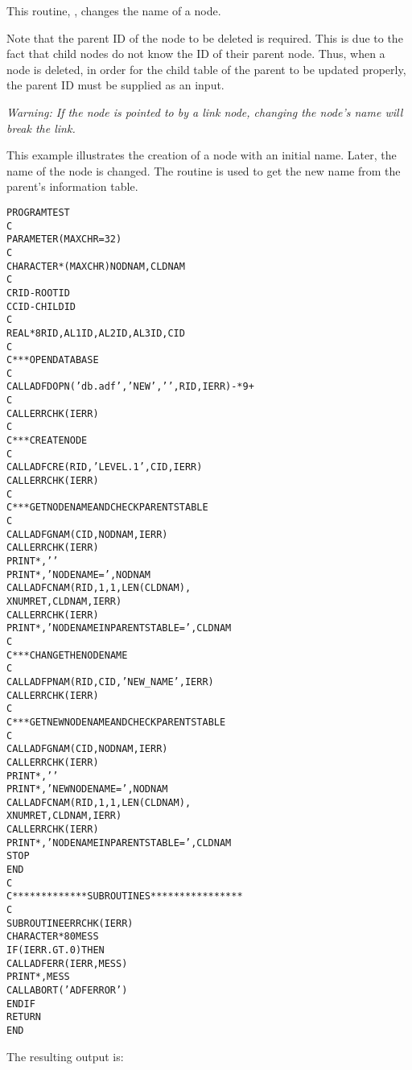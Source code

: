 This routine, , changes the name of a node.

Note that the parent ID of the node to be deleted is required.
This is due to the fact that child nodes do not know the ID of their
parent node.
Thus, when a node is deleted, in order for the child table of the parent
to be updated properly, the parent ID must be supplied as an input.

\emph{Warning: If the node is pointed to by a link node, changing the
node's name will break the link.}

\Example

This example illustrates the creation of a node with an initial name.
Later, the name of the node is changed.
The routine  is used to get the new name from the
parent's information table.

\begin{alltt}
   PROGRAM TEST
   C
         PARAMETER (MAXCHR=32)
   C
         CHARACTER*(MAXCHR) NODNAM,CLDNAM
   C
   C     RID - ROOT ID
   C     CID - CHILD ID
   C
         REAL*8 RID,AL1ID,AL2ID,AL3ID,CID
   C
   C *** OPEN DATABASE
   C
         CALL ADFDOPN('db.adf','NEW',' ',RID,IERR)-*9+
   C
         CALL ERRCHK(IERR)
   C
   C *** CREATE NODE
   C
         CALL ADFCRE(RID,'LEVEL.1',CID,IERR)
         CALL ERRCHK(IERR)
   C
   C *** GET NODE NAME AND CHECK PARENTS TABLE
   C
         CALL ADFGNAM(CID,NODNAM,IERR)
         CALL ERRCHK(IERR)
         PRINT *,' '
         PRINT *,' NODE NAME = ',NODNAM
         CALL ADFCNAM(RID,1,1,LEN(CLDNAM),
        X             NUMRET,CLDNAM,IERR)
         CALL ERRCHK(IERR)
         PRINT *,' NODE NAME IN PARENTS TABLE = ',CLDNAM
   C
   C *** CHANGE THE NODE NAME
   C
         CALL ADFPNAM(RID,CID,'NEW_NAME',IERR)
         CALL ERRCHK(IERR)
   C
   C *** GET NEW NODE NAME AND CHECK PARENTS TABLE
   C
         CALL ADFGNAM(CID,NODNAM,IERR)
         CALL ERRCHK(IERR)
         PRINT *,' '
         PRINT *,' NEW NODE NAME = ',NODNAM
         CALL ADFCNAM(RID,1,1,LEN(CLDNAM),
        X             NUMRET,CLDNAM,IERR)
         CALL ERRCHK(IERR)
         PRINT *,' NODE NAME IN PARENTS TABLE = ',CLDNAM
         STOP
         END
   C
   C ************* SUBROUTINES ****************
   C
         SUBROUTINE ERRCHK(IERR)
         CHARACTER*80 MESS
         IF (IERR .GT. 0) THEN
            CALL ADFERR(IERR,MESS)
            PRINT *,MESS
            CALL ABORT('ADF ERROR')
         ENDIF
         RETURN
         END
\end{alltt}

\noindent
The resulting output is:

